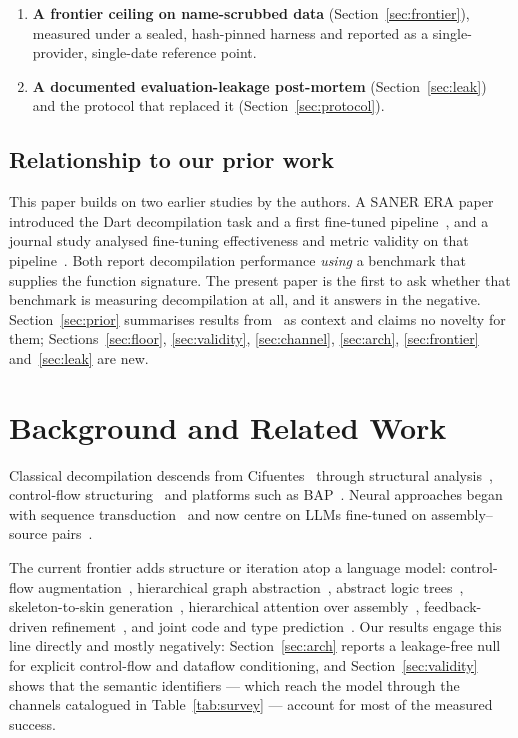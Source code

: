 \documentclass[conference]{IEEEtran}
\begin{document}
\begin{enumerate}[leftmargin=*,topsep=2pt,itemsep=1pt]
(Section~\ref{sec:arch}): sixteen controlled interventions with one significant
effect and a control-flow-edge effect whose sign reverses across seeds, together
with a rejection-sampling programme closed across six checkpoints and three
arrangements.
\item \textbf{A frontier ceiling on name-scrubbed data}
(Section~\ref{sec:frontier}), measured under a sealed, hash-pinned harness and
reported as a single-provider, single-date reference point.
\item \textbf{A documented evaluation-leakage post-mortem}
(Section~\ref{sec:leak}) and the protocol that replaced it
(Section~\ref{sec:protocol}).
\end{enumerate}

\subsection{Relationship to our prior work}
This paper builds on two earlier studies by the authors. A SANER ERA paper
introduced the Dart decompilation task and a first fine-tuned
pipeline~\cite{abualazm2026idiomatic}, and a journal study analysed fine-tuning
effectiveness and metric validity on that
pipeline~\cite{abualazm2026tosem}. Both report decompilation performance
\emph{using} a benchmark that supplies the function signature. The present paper
is the first to ask whether that benchmark is measuring decompilation at all,
and it answers in the negative. Section~\ref{sec:prior} summarises
results from~\cite{abualazm2026tosem} as context and claims no novelty for them;
Sections~\ref{sec:floor}, \ref{sec:validity}, \ref{sec:channel}, \ref{sec:arch},
\ref{sec:frontier} and~\ref{sec:leak} are new.

\section{Background and Related Work}
Classical decompilation descends from Cifuentes~\cite{cifuentes1994reverse}
through structural analysis~\cite{schwartz2013native}, control-flow
structuring~\cite{yakdan2015no} and platforms such as
BAP~\cite{brumley2011bap}. Neural approaches began with sequence
transduction~\cite{katz2018using,fu2019coda} and now centre on LLMs fine-tuned
on assembly--source pairs~\cite{llm4decompile}.

The current frontier adds structure or iteration atop a language model:
control-flow augmentation~\cite{liu2025cfadecllm}, hierarchical graph
abstraction~\cite{achamyeleh2026helios}, abstract logic
trees~\cite{wang2025salt4decompile}, skeleton-to-skin
generation~\cite{tan2025sk2decompile}, hierarchical attention over
assembly~\cite{jiang2025nova}, feedback-driven
refinement~\cite{liu2026autodecompiler}, and joint code and type
prediction~\cite{dramko2025idioms}. Our results engage this line directly and
mostly negatively: Section~\ref{sec:arch} reports a leakage-free null for
explicit control-flow and dataflow conditioning, and Section~\ref{sec:validity}
shows that the semantic identifiers --- which reach the model through the
channels catalogued in Table~\ref{tab:survey} --- account for most of the
measured success.
\end{document}
